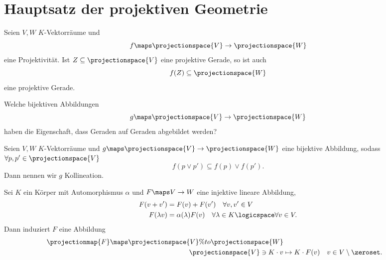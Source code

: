 \section{Hauptsatz der projektiven Geometrie}
Seien \( V,W \) \( K \)-Vektorräume und
\begin{equation*}
  f\maps \projectionspace{V}\to\projectionspace{W}
\end{equation*}
eine Projektivität. Ist \( Z\subseteq \projectionspace{V} \) eine projektive Gerade, so ist auch
\begin{equation*}
  f(Z)\subseteq \projectionspace{W}
\end{equation*}
eine projektive Gerade.

\begin{frage*}
  Welche bijektiven Abbildungen
  \begin{equation*}
    g\maps \projectionspace{V}\to \projectionspace{W}
  \end{equation*}
  haben die Eigenschaft, dass Geraden auf Geraden abgebildet werden?
\end{frage*}
\begin{definition*}
  Seien \( V,W \) \( K \)-Vektorräume und \( g\maps \projectionspace{V}\to \projectionspace{W} \) eine bijektive Abbildung, sodass \( \forall p,p'\in \projectionspace{V} \)
  \begin{equation*}
    f(p\vee p')\subseteq f(p)\vee f(p').
  \end{equation*}
  Dann nennen wir \( g \) Kollineation.
\end{definition*}
\begin{beispiel*}
  Sei \( K \) ein Körper mit Automorphismus \( \alpha \) und \( F\maps V\to W \) eine injektive   lineare Abbildung, \dh 
  \begin{align*}
    F(v+v')&=F(v)+F(v')\quad \forall v,v'\in V\\
    F(\lambda v)&=\alpha(\lambda)F(v)\quad \forall \lambda\in K\logicspace \forall v\in V.
  \end{align*}
  Dann induziert \( F \) eine Abbildung
  \begin{equation*}
    \begin{split}
      \projectionmap{F}\maps \projectionspace{V}\%to \projectionspace{W}\\
      \projectionspace{V}\ni K\cdot v&\mapsto K\cdot F(v)\quad v\in V\setminus\zeroset.
    \end{split}
  \end{equation*}
\end{beispiel*}

